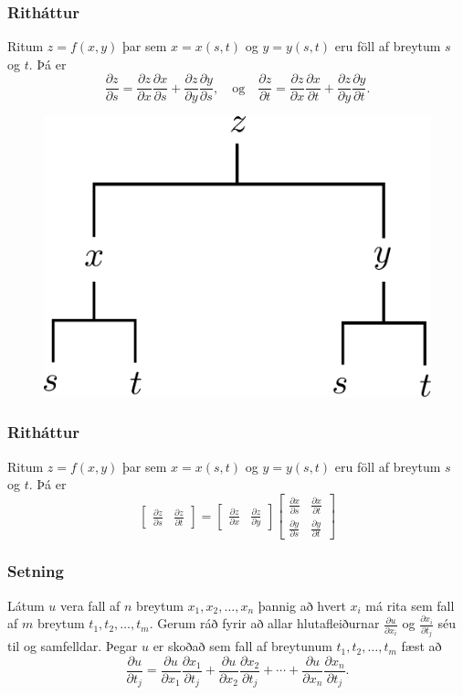 \subsubsection{Ritháttur }

Ritum $z=f(x,y)$ þar sem $x=x(s,t)$ og $y=y(s,t)$ eru föll af breytum $s$ og  $t$.  Þá er 
$$\frac{\partial z}{\partial s}=
\frac{\partial z}{\partial x}\frac{\partial x}{\partial s}
+\frac{\partial z}{\partial y}\frac{\partial y}{\partial s}, \quad \text{og}\quad \frac{\partial z}{\partial t}=
\frac{\partial z}{\partial x}\frac{\partial x}{\partial t}
+\frac{\partial z}{\partial y}\frac{\partial y}{\partial t}.$$

 \begin{figure}[h!]
           \centering
            \includegraphics[width=0.35\linewidth]{chain2}
	\caption*{}
    \end{figure}


\subsubsection{Ritháttur}
 Ritum $z=f(x,y)$ þar sem $x=x(s,t)$ og $y=y(s,t)$ eru föll af breytum $s$ og  $t$.  Þá er 
$$\begin{bmatrix}\frac{\partial z}{\partial s} 
& \frac{\partial z}{\partial t}\end{bmatrix}
=\begin{bmatrix}\frac{\partial z}{\partial x} 
& \frac{\partial z}{\partial y}\end{bmatrix}
\begin{bmatrix}\frac{\partial x}{\partial s} 
& \frac{\partial x}{\partial t}\\
\frac{\partial y}{\partial s} 
& \frac{\partial y}{\partial t}
\end{bmatrix}$$

 

\subsubsection{Setning }
Látum $u$ vera fall af $n$ breytum $x_1, x_2, \ldots, x_n$ þannig að hvert $x_i$ má rita sem fall af $m$ breytum $t_1, t_2, \ldots, t_m$.  Gerum ráð fyrir að allar hlutafleiðurnar $\frac{\partial u}{\partial x_i}$ og $\frac{\partial x_i}{\partial t_j}$ séu til og samfelldar.  Þegar $u$ er skoðað sem fall af breytunum $t_1, t_2, \ldots, t_m$ fæst að 
$$\frac{\partial u}{\partial t_j}=
\frac{\partial u}{\partial x_1}\frac{\partial x_1}{\partial t_j}
+\frac{\partial u}{\partial x_2}\frac{\partial x_2}{\partial t_j}
+\cdots+
\frac{\partial u}{\partial x_n}\frac{\partial x_n}{\partial t_j}.$$

